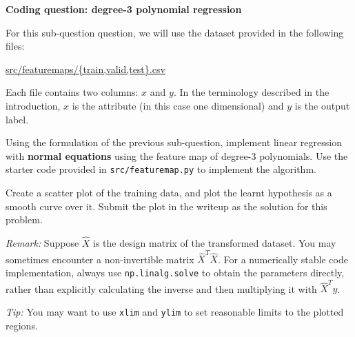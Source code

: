 \item {} {\bf Coding question: degree-3 polynomial regression}


For this sub-question question, we will use the dataset provided in
the following files:
%
\begin{center}
	\url{src/featuremaps/{train,valid,test}.csv}
\end{center}
%

Each file contains two columns: $x$ and $y$. In the terminology described in the introduction, $x$ is the attribute (in this case one dimensional) and $y$ is the output label.

Using the formulation of the previous sub-question, implement linear regression with \textbf{normal equations} using the feature map of degree-3 polynomials. Use the starter code provided in \texttt{src/featuremap.py} to implement the algorithm.

Create a scatter plot of the training data, and plot the learnt hypothesis as a smooth curve over it. Submit the plot in the writeup as the solution for this problem.

\emph{Remark: } Suppose $\widehat{X}$ is the design matrix of the transformed dataset. You may sometimes encounter a non-invertible matrix $\widehat{X}^T\widehat{X}$. For a numerically stable code implementation, always use \texttt{np.linalg.solve} to obtain the parameters directly, rather than explicitly calculating the inverse and then multiplying it with $\widehat{X}^Ty$.

\emph{Tip: } You may want to use \texttt{xlim} and \texttt{ylim} to set reasonable limits to the plotted regions.

